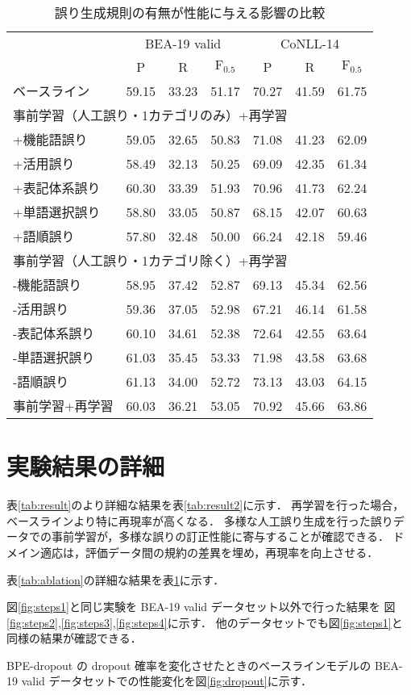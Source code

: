\documentclass[
  platex, dvipdfmx %
]{nlp2021}
\begin{document}
\begin{table}[h]
	\centering
	\small
	\tabcolsep 1.2pt
	\caption{誤り生成規則の有無が性能に与える影響の比較}
	\label{tab:ablation2}
	\begin{tabular}{@{\extracolsep{2.5pt}}l ccc ccc@{}}
		\hline
		& \multicolumn{3}{c}{BEA-19 valid}
		& \multicolumn{3}{c}{CoNLL-14}
		\\ \cline{2-4} \cline{5-7}
		& P & R & $\textrm{F}_{0.5}$
		& P & R & $\textrm{F}_{0.5}$
		\\ \hline
		ベースライン
		& 59.15 & 33.23 & 51.17
		& 70.27 & 41.59 & 61.75
		\\
		\hline
		\multicolumn{7}{l}{事前学習（人工誤り・1カテゴリのみ）+再学習}
		\\
		+機能語誤り
		& 59.05 & 32.65 & 50.83
		& 71.08 & 41.23 & 62.09
		\\
		+活用誤り
		& 58.49 & 32.13 & 50.25
		& 69.09 & 42.35 & 61.34
		\\
		+表記体系誤り
		& 60.30 & 33.39 & 51.93
		& 70.96 & 41.73 & 62.24
		\\
		+単語選択誤り
		& 58.80 & 33.05 & 50.87
		& 68.15 & 42.07 & 60.63
		\\
		+語順誤り
		& 57.80 & 32.48 & 50.00
		& 66.24 & 42.18 & 59.46
		\\
		\hline
		\multicolumn{7}{l}{事前学習（人工誤り・1カテゴリ除く）+再学習}
		\\
		-機能語誤り
		& 58.95 & 37.42 & 52.87
		& 69.13 & 45.34 & 62.56
		\\
		-活用誤り
		& 59.36 & 37.05 & 52.98
		& 67.21 & 46.14 & 61.58
		\\
		-表記体系誤り
		& 60.10 & 34.61 & 52.38
		& 72.64 & 42.55 & 63.64
		\\
		-単語選択誤り
		& 61.03 & 35.45 & 53.33
		& 71.98 & 43.58 & 63.68
		\\
		-語順誤り
		& 61.13 & 34.00 & 52.72
		& 73.13 & 43.03 & 64.15
		\\
		\hline
		事前学習+再学習
		& 60.03 & 36.21 & 53.05
		& 70.92 & 45.66 & 63.86
		\\
		\hline
	\end{tabular}
\end{table}

\section{実験結果の詳細}
表\ref{tab:result}のより詳細な結果を表\ref{tab:result2}に示す．
再学習を行った場合，ベースラインより特に再現率が高くなる．
多様な人工誤り生成を行った誤りデータでの事前学習が，多様な誤りの訂正性能に寄与することが確認できる．
ドメイン適応は，評価データ間の規約の差異を埋め，再現率を向上させる．

表\ref{tab:ablation}の詳細な結果を表\ref{tab:ablation2}に示す．

図\ref{fig:steps1}と同じ実験を
BEA-19 valid データセット以外で行った結果を
図\ref{fig:steps2},\ref{fig:steps3},\ref{fig:steps4}に示す．
他のデータセットでも図\ref{fig:steps1}と同様の結果が確認できる．

BPE-dropout の dropout 確率を変化させたときのベースラインモデルの BEA-19 valid データセットでの性能変化を図\ref{fig:dropout}に示す．
\end{document}
